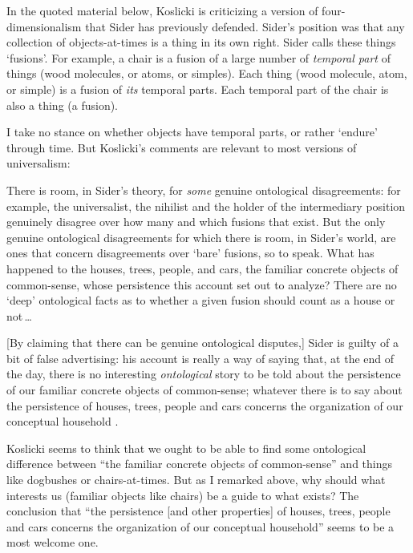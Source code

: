 \documentclass[11pt]{article}
\newenvironment{squote}{%
\begin{spacing}{1}
       	\begin{list}{}{%
\setlength{\labelwidth}{0pt}%
\rightmargin\leftmargin%
}
\item\relax
}{%
\end{list}%
\end{spacing}
}
\begin{document}
\begin{spacing}{1.25}
In the quoted material below, Koslicki is criticizing a version of
four-dimensionalism that Sider has previously defended.  Sider's
position was that any collection of objects-at-times is a thing in its
own right.  Sider calls these things `fusions'.  For example, a chair
is a fusion of a large number of {\em temporal part} of things (wood
molecules, or atoms, or simples).  Each thing (wood molecule, atom, or
simple) is a fusion of {\em its} temporal parts.  Each temporal part
of the chair is also a thing (a fusion).

I take no stance on whether objects have temporal parts, or rather
`endure' through time.  But Koslicki's comments are relevant to most
versions of universalism:

\begin{squote}
There is room, in Sider's theory, for {\em some} genuine ontological
disagreements: for example, the universalist, the nihilist and the
holder of the intermediary position genuinely disagree over how many
and which fusions that exist.  But the only genuine ontological
disagreements for which there is room, in Sider's world, are ones that
concern disagreements over `bare' fusions, so to speak.  What has
happened to the houses, trees, people, and cars, the familiar concrete
objects of common-sense, whose persistence this account set out to
analyze?  There are no `deep' ontological facts as to whether a given
fusion should count as a house or not\,\ldots

[By claiming that there can be genuine ontological disputes,] Sider is
guilty of a bit of false advertising: his account is really a way of
saying that, at the end of the day, there is no interesting {\em
  ontological} story to be told about the persistence of our familiar
concrete objects of common-sense; whatever there is to say about the
persistence of houses, trees, people and cars concerns the
organization of our conceptual household
\citeyearpar[124--125]{koslicki2003}.
\end{squote}

Koslicki seems to think that we ought to be able to find some
ontological difference between ``the familiar concrete objects of
common-sense'' and things like dogbushes or chairs-at-times.  But as I
remarked above, why should what interests us (familiar objects like
chairs) be a guide to what exists?  The conclusion that ``the
persistence [and other properties] of houses, trees, people and cars
concerns the organization of our conceptual household'' seems to be a
most welcome one.


\end{spacing}
\end{document}

